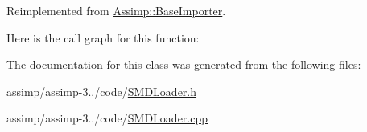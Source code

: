 Reimplemented from \hyperlink{class_assimp_1_1_base_importer_a2ecaa6b808b2b282cb6aa321970a2ad3}{Assimp\+::\+Base\+Importer}.



Here is the call graph for this function\+:




The documentation for this class was generated from the following files\+:\begin{DoxyCompactItemize}
\item 
assimp/assimp-\/3../code/\hyperlink{_s_m_d_loader_8h}{S\+M\+D\+Loader.\+h}\item 
assimp/assimp-\/3../code/\hyperlink{_s_m_d_loader_8cpp}{S\+M\+D\+Loader.\+cpp}\end{DoxyCompactItemize}
